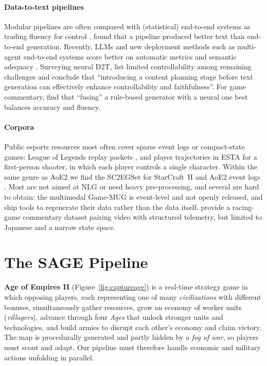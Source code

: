 \documentclass[11pt]{article}
\begin{document}
\paragraph{Data-to-text pipelines}
Modular pipelines are often compared with (statistical) end-to-end systems as trading fluency for control \citep{gatt2018}. \citet{castroferreira2019} found that a pipeline produced better text than end-to-end generation. Recently, LLMs and new deployment methods such as multi-agent end-to-end systems score better on automatic metrics and semantic adequacy \citep{osuji2024,osuji2025}. Surveying neural D2T, \citet{lin2024} list limited controllability among remaining challenges and conclude that ``introducing a content planning stage before text generation can effectively enhance controllability and faithfulness''. For game commentary, \citet{zhang2022} find that ``fusing'' a rule-based generator with a neural one best balances accuracy and fluency.

\paragraph{Corpora}
Public esports resources most often cover sparse event logs or compact-state games: League of Legends replay packets \citep{zhu2025}, and player trajectories in ESTA \citep{xenopoulos2022} for a first-person shooter, in which each player controls a single character. Within the same genre as AoE2 we find the SC2EGSet for StarCraft~II \citep{bialecki2023} and AoE2 event logs \citep{liss2024}. Most are not aimed at NLG or need heavy pre-processing, and several are hard to obtain: the multimodal Game-MUG \citep{zhang2024} is event-level and not openly released, and \citet{wang2024} ship tools to regenerate their data rather than the data itself. \citet{ishigaki2021} provide a racing-game commentary dataset pairing video with structured telemetry, but limited to Japanese and a narrow state space.

\section{The SAGE Pipeline}
\label{sec:pipeline}
\textbf{Age of Empires II} (Figure~\ref{fig:captureage}) is a real-time strategy game in which opposing players, each representing one of many \emph{civilizations} with different bonuses, simultaneously gather resources, grow an economy of worker units (\emph{villagers}), advance through four \emph{Ages} that unlock stronger units and technologies, and build armies to disrupt each other's economy and claim victory. The map is procedurally generated and partly hidden by a \emph{fog of war}, so players must scout and adapt. Our pipeline must therefore handle economic and military actions unfolding in parallel.
\end{document}
